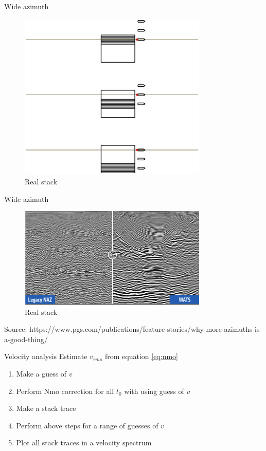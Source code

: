 \documentclass[xcolor=dvipsnames,notes]{beamer}
\begin{document}
\begin{frame}{Wide azimuth}
\begin{figure}
  \includegraphics[width=0.8\textwidth]{Fig/wats-7.eps}
  \caption{Real stack}
  \label{fig:wats2}
\end{figure}
\end{frame}
\begin{frame}{Wide azimuth}
\begin{figure}
  \includegraphics[width=0.8\textwidth]{Fig/wats.png}
  \caption{Real stack}
  \label{fig:wats1}
\end{figure}
\tiny Source:
https://www.pgs.com/publications/feature-stories/why-more-azimuths-is-a-good-thing/
\end{frame}
\begin{frame}{Velocity analysis}
%
  Estimate $v_{rms}$ from equation \eqref{eq:nmo}
\begin{enumerate}
  \item Make a guess of $v$ 
  \item Perform Nmo correction for all $t_0$ with using guess of $v$
  \item Make a stack trace
  \item Perform above steps for a range of guesses of $v$
  \item Plot all stack traces in a velocity spectrum
\end{enumerate}
\end{frame}
\end{document}
